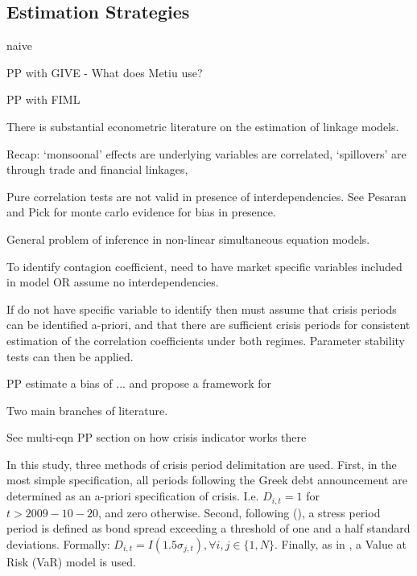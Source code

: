 \documentclass[../base.tex]{subfiles}
\begin{document}
\subsection{Estimation Strategies}

naive

PP with GIVE - What does Metiu use?

 
PP with FIML
\cite{massacci2007identification}
















There is substantial econometric literature on the estimation of linkage models. 

Recap: `monsoonal' effects are underlying variables are correlated, `spillovers' are through trade and financial linkages, 

Pure correlation tests are not valid in presence of interdependencies. See Pesaran and Pick for monte carlo evidence for bias in presence. 

General problem of inference in non-linear simultaneous equation models. 

To identify contagion coefficient, need to have market specific variables included in model OR assume no interdependencies.

If do not have specific variable to identify then must assume that crisis periods can be identified a-priori, and that there are sufficient crisis periods for consistent estimation of the correlation coefficients under both regimes. Parameter stability tests can then be applied. 

PP estimate a bias of ... and propose a framework for 

Two main branches of literature. 


See multi-eqn PP section on how crisis indicator works there

In this study, three methods of crisis period delimitation are used. First, in the most simple specification, all periods following the Greek debt announcement are determined as an a-priori specification of crisis. I.e. $D_{i,t} = 1$ for $t > 2009-10-20$, and zero otherwise. Second, following (), a stress period period is defined as bond spread exceeding a threshold of one and a half standard deviations. Formally: $D_{i,t} = I(1.5\sigma_{j,t}), \forall i, j \in \{1, N\}$. Finally, as in \cite{metiu2012sovereign}, a Value at Risk (VaR) model is used. 
\end{document}
